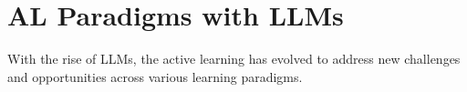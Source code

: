 \begin{comment}
\rowcolor{darkred}
\quad \textsc{\textcolor{googlered}{Hybrid Approach} (\S~\ref{sec:oracle-hybrid})}
& 
& 
& 
& 
& 
& 
& 
& 
& 
& 
& 
& 
& 
& 
& 
& 
\\

\rowcolor{lightred} 
\quad \quad \textbf{Adaptive}
& TODO
& \textcolor{grey}{$\checkmark$} 
& $\checkmark$ 
& \textcolor{grey}{$\checkmark$} 
& 
& \textcolor{grey}{$\checkmark$} 
& 
& $\checkmark$ 
& $\checkmark$ 
& $\checkmark$ 
& $\checkmark$ 
& $\checkmark$ 
& $\checkmark$ 
& $\checkmark$ 
& $\checkmark$ 
& $\checkmark$ 
\\




\boldbottomline


\end{tabularx}
\end{table*}



\end{comment}


\section{AL Paradigms with LLMs } \label{app:setting}

With the rise of LLMs, the active learning has evolved to address new challenges and opportunities across various learning paradigms. 


